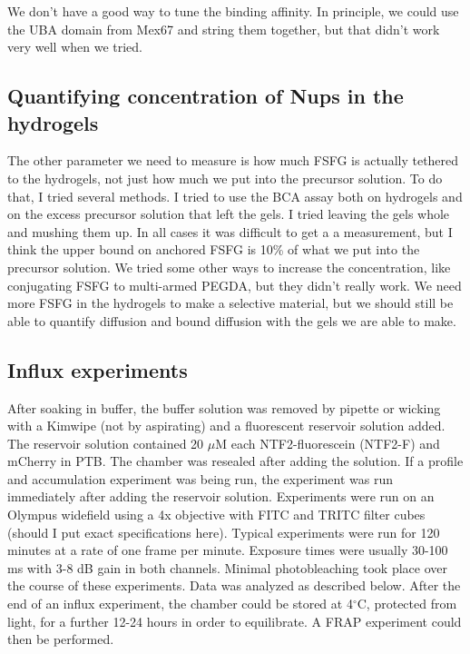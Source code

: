 We don't have a good way to tune the binding affinity.  In principle, we could use the UBA domain from Mex67 and string them together, but that didn't work very well when we tried.

\subsection{Quantifying concentration of Nups in the hydrogels}

The other parameter we need to measure is how much FSFG is actually tethered to the hydrogels, not just how much we put into the precursor solution.  To do that, I tried several methods.  I tried to use the BCA assay both on hydrogels and on the excess precursor solution that left the gels.  I tried leaving the gels whole and mushing them up.  In all cases it was difficult to get a a measurement, but I think the upper bound on anchored FSFG is 10\% of what we put into the precursor solution.  We tried some other ways to increase the concentration, like conjugating FSFG to multi-armed PEGDA, but they didn't really work.  We need more FSFG in the hydrogels to make a selective material, but we should still be able to quantify diffusion and bound diffusion with the gels we are able to make.

\subsection{Influx experiments}
After soaking in buffer, the buffer solution was removed by pipette or wicking with a Kimwipe (not by aspirating) and a fluorescent reservoir solution added.  The reservoir solution contained 20 $\mu$M each NTF2-fluorescein (NTF2-F) and mCherry in PTB.  The chamber was resealed after adding the solution.  If a profile and accumulation experiment was being run, the experiment was run immediately after adding the reservoir solution.  Experiments were run on an Olympus widefield using a 4x objective with FITC and TRITC filter cubes (should I put exact specifications here).  Typical experiments were run for 120 minutes at a rate of one frame per minute.  Exposure times were usually 30-100 ms with 3-8 dB gain in both channels.  Minimal photobleaching took place over the course of these experiments.  Data was analyzed as described below.  After the end of an influx experiment, the chamber could be stored at 4$^\circ$C, protected from light, for a further 12-24 hours in order to equilibrate.  A FRAP experiment could then be performed.

